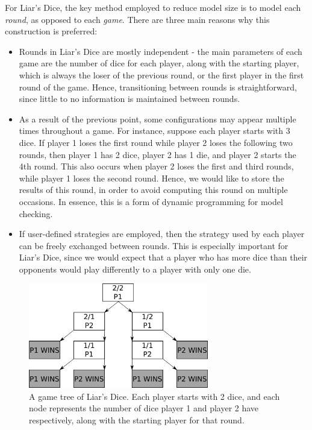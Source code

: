 For Liar's Dice, the key method employed to reduce model size is to model each \emph{round}, as opposed to each \emph{game}. There are three main reasons why this construction is preferred:

\begin{itemize}
    \item Rounds in Liar's Dice are mostly independent - the main parameters of each game are the number of dice for each player, along with the starting player, which is always the loser of the previous round, or the first player in the first round of the game. Hence, transitioning between rounds is straightforward, since little to no information is maintained between rounds.
    \item As a result of the previous point, some configurations may appear multiple times throughout a game. For instance, suppose each player starts with 3 dice. If player 1 loses the first round while player 2 loses the following two rounds, then player 1 has 2 dice, player 2 has 1 die, and player 2 starts the 4th round. This also occurs when player 2 loses the first and third rounds, while player 1 loses the second round. Hence, we would like to store the results of this round, in order to avoid computing this round on multiple occasions. In essence, this is a form of dynamic programming for model checking.
    \item If user-defined strategies are employed, then the strategy used by each player can be freely exchanged between rounds. This is especially important for Liar's Dice, since we would expect that a player who has more dice than their opponents would play differently to a player with only one die.
\end{itemize}

\begin{figure}[h]
    \centering
    \includegraphics[width=0.7\textwidth]{images/LiarsDice/2_dice_game_tree.pdf}
    \caption{A game tree of Liar's Dice. Each player starts with 2 dice, and each node represents the number of dice player 1 and player 2 have respectively, along with the starting player for that round.}
    \label{cs2:2_dice_game_tree}
\end{figure}

